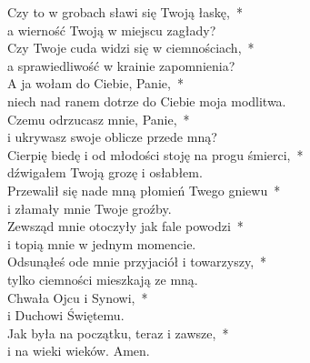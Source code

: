 \begin{tabbing}
\>Czy to w grobach sławi się Twoją łaskę,~*\\
\>a wierność Twoją w miejscu zagłady?\\
Czy Twoje cuda widzi się w ciemnościach,~*\\
a sprawiedliwość w krainie zapomnienia?\\
\>A ja wołam do Ciebie, Panie,~*\\
\>niech nad ranem dotrze do Ciebie moja modlitwa.\\
Czemu odrzucasz mnie, Panie,~*\\
i ukrywasz swoje oblicze przede mną?\\
\>Cierpię biedę i od młodości stoję na progu śmierci,~*\\
\>dźwigałem Twoją grozę i osłabłem.\\
Przewalił się nade mną płomień Twego gniewu~*\\
i złamały mnie Twoje groźby.\\
\>Zewsząd mnie otoczyły jak fale powodzi~*\\
\>i topią mnie w jednym momencie.\\
Odsunąłeś ode mnie przyjaciół i towarzyszy,~*\\
tylko ciemności mieszkają ze mną.\\
\>Chwała Ojcu i Synowi,~*\\
\>i Duchowi Świętemu.\\
Jak była na początku, teraz i zawsze,~*\\
i na wieki wieków. Amen.
\end{tabbing}


